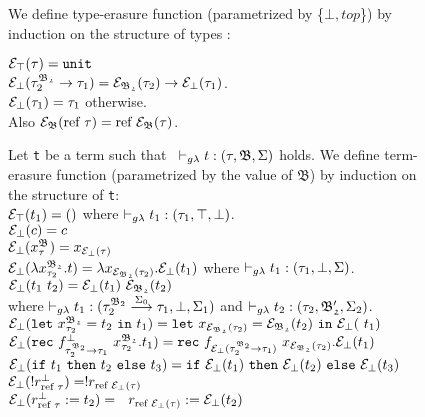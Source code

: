 \begin{figure}[H]
\hrulefill
\begin{dfn} 
\label{type-erasure}
We define type-erasure function (parametrized by \{$\bot, top$\})  
by induction on the structure of types : \vspace{0.2cm} 

\noindent$ \e_{\top}(\tau) = \texttt{unit} $ \\
\noindent$ 
\e_{\bot}(\tau_{2}^{\mathfrak{B_{2}}} \rightarrow \tau_{1})  
= \e_{\mathfrak{B_{2}}}(\tau_{2}) \rightarrow \e_{\bot}(\tau_{1}) $. \\
\noindent$ \e_{\bot}(\tau_{1}) = \tau_{1}$ \qquad\qquad otherwise.\\

Also $\e_{\mf{B}}(\text{ref } \tau) = \text{ref } \e_{\mf{B}}(\tau) $.\\
\end{dfn}

\begin{dfn}
Let \texttt{t} be a term such that 
~$\typrule{t}{\tau}{\mathfrak{B}}{\Sigma}$ holds. 
We define term-erasure function 
(parametrized by the value of $ \mathfrak{B}$) by induction on 
the structure of \texttt{t}: \\[0.1cm]
\noindent$ \e_{\top}(t_1) = () $ 
\quad where $ \typrule{t_{1}}{\tau_{1}}{\top}{\bot}$.\\
\noindent$ \e_{\bot}(c) = c $\\
\noindent$ \e_{\bot}(\gvar{x}{}{}) = x_{\e_{\bot}(\tau)} $\\
\noindent$ \e_{\bot}(\gabst{x}{2}{2}{t}) =  
\lambda x_{\e_{\mathfrak{B_{2}}}(\tau_{2})}. \e_{\bot}(t_{1})$
\quad where $ \typrule{t_{1}}{\tau_{1}}{\bot}{\Sigma}$.\\
\noindent$ 
\e_{\bot}(t_1~t_2) =\e_{\bot}(t_{1})~\e_{\mathfrak{B_{2}}}(t_{2})$ \\
where 
$\typrule{t_{1}}
	{\tau_{2}^{\mathfrak{B}_{2}} 
	\stackrel{\Sigma_{0}}{\longrightarrow} \tau_{1}}
	{\bot}{\Sigma_1}$ and 
$ \typrule{t_{2}}{\tau_{2}}{\mf{B'_{2}}}{\Sigma_2}$.\\
\noindent
$\e_{\bot}(\mathtt{let}~\gvar{x}{2}{2}= t_2~\mathtt{in}~t_1) = 
\mathtt{let}~x_{\e_{\mf{B_2}}(\tau_2)} = \e_{\mf{B_2}}(t_2) ~\mathtt{in}~\e_{\bot}(~t_1)
 $\\
\noindent
$\e_{\bot}
(\mathtt{rec}~\var{f}{\bot}{\tarr{2}{1}{2}}~\gvar{x}{2}{2}. t_1)
= 
\mathtt{rec}~
	f_{\e_{\bot}(\tarr{2}{1}{2})}~x_{\e_{\mf{B_{2}}}(\tau_{2})}.
 \e_{\bot}(t_1)$\\
\noindent
$\e_{\bot}(\mathtt{if}~t_1~\mathtt{then}~t_2~\mathtt{else}~t_3) 
=
\mathtt{if}~\e_{\bot}(t_1)~
\mathtt{then}~\e_{\bot}(t_2)~
\mathtt{else}~\e_{\bot}(t_3)$ \\
\noindent
$\e_{\bot}(!r^{\bot}_{\text{ref } \tau}) 
= !r_{\text{ref }\e_{\bot}(\tau)} $ \\
\noindent
$\e_{\bot}(r^{\bot}_{\text{ref }\tau} := t_2) = ~~
r_{\text{ref } \e_{\bot}(\tau)} := \e_{\bot}(t_2)$\\
\end{dfn}


\end{figure}
